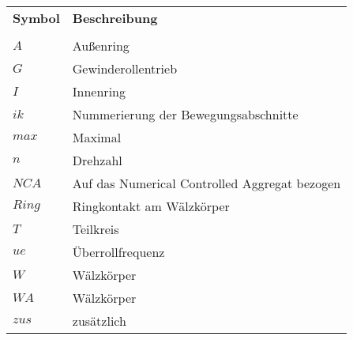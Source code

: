\begin{tabularx}{\textwidth}{ll}
\textbf{Symbol} & \textbf{Beschreibung}\\
& \\
$A$ & Außenring \\
$G$ & Gewinderollentrieb \\
$I$ & Innenring \\
$ik$ & Nummerierung der Bewegungsabschnitte \\
$max$ & Maximal \\
$n$ & Drehzahl \\
$NCA$ & Auf das Numerical Controlled Aggregat bezogen \\
$Ring$ & Ringkontakt am Wälzkörper \\
$T$ & Teilkreis \\
$ue$ & Überrollfrequenz \\
$W$ & Wälzkörper \\
$WA$ & Wälzkörper \\
$zus$ & zusätzlich \\
\end{tabularx}



